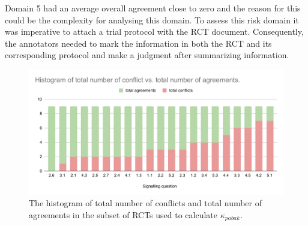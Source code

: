 \documentclass[sn-mathphys,Numbered]{sn-jnl}%
\theoremstyle{thmstyleone}%
\theoremstyle{thmstyletwo}%
\theoremstyle{thmstylethree}%
\begin{document}
Domain 5 had an average overall agreement close to zero and the reason for this could be the complexity for analysing this domain.
To assess this risk domain it was imperative to attach a trial protocol with the RCT document.
Consequently, the annotators needed to mark the information in both the RCT and its corresponding protocol and make a judgment after summarizing information.


%
%
%
\begin{figure}
    \centering
    \includegraphics[width=0.99\columnwidth]{figures/agreements.pdf}
    \caption{The histogram of total number of conflicts and total number of agreements in the subset of RCTs used to calculate $\kappa_{pabak}$.}
    \label{fig:pabakagreement}
\end{figure}
%
%
%

%
%
%
\end{document}
